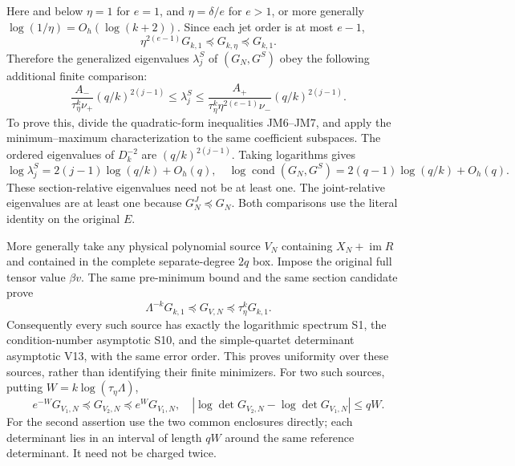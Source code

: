 \documentclass[11pt]{article}
\begin{document}
Here and below $\eta=1$ for $e=1$, and $\eta=\delta/e$ for $e>1$,
or more generally $\log(1/\eta)=O_h(\log(k+2))$.
Since each jet order is at most $e-1$,
\[
 \eta^{2(e-1)}G_{k,1}\preceq G_{k,\eta}\preceq G_{k,1}.
 \tag{JM7}
\]
Therefore the generalized eigenvalues $\lambda^S_j$ of $(G_N,G^S)$
obey the following additional finite comparison:
\[
 \frac{A_-}{\tau_\eta^k\nu_+}(q/k)^{2(j-1)}
 \le\lambda^S_j\le
 \frac{A_+}{\tau_\eta^k\eta^{2(e-1)}\nu_-}(q/k)^{2(j-1)}.
 \tag{JM8}
\]
To prove this, divide the quadratic-form inequalities JM6--JM7,
and apply the minimum--maximum characterization to the same
coefficient subspaces. The ordered eigenvalues of $D_k^{-2}$ are
$(q/k)^{2(j-1)}$. Taking logarithms gives
\[
 \log\lambda^S_j=2(j-1)\log(q/k)+O_h(q),\quad
 \log\operatorname{cond}(G_N,G^S)
 =2(q-1)\log(q/k)+O_h(q).\tag{JM9}
\]
These section-relative eigenvalues need not be at least one.
The joint-relative eigenvalues are at least one because $G_N^J\preceq G_N$.
Both comparisons use the literal identity on the original $E$.

More generally take any physical polynomial source $V_N$ containing
$X_N+\operatorname{im}R$ and contained in the complete separate-degree
$2q$ box. Impose the original full tensor value $\beta v$.
The same pre-minimum bound and the same section candidate prove
\[
 \Lambda^{-k}G_{k,1}\preceq G_{V,N}\preceq\tau_\eta^kG_{k,1}.
 \tag{JM10}
\]
Consequently every such source has exactly the logarithmic spectrum
S1, the condition-number asymptotic S10, and the simple-quartet
determinant asymptotic V13, with the same error order. This proves
uniformity over these sources, rather than identifying their finite
minimizers. For two such sources, putting $W=k\log(\tau_\eta\Lambda)$,
\[
 e^{-W}G_{V_1,N}\preceq G_{V_2,N}\preceq e^WG_{V_1,N},\quad
 |\log\det G_{V_2,N}-\log\det G_{V_1,N}|\le qW.\tag{JM11}
\]
For the second assertion use the two common enclosures directly;
each determinant lies in an interval of length $qW$ around the
same reference determinant. It need not be charged twice.
\end{document}

